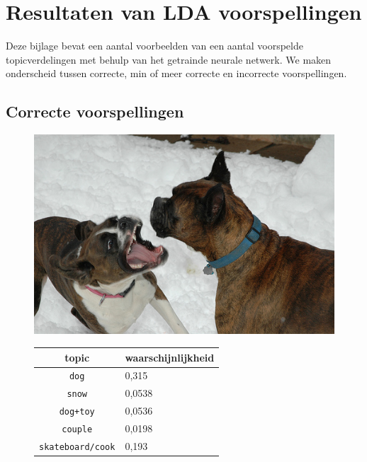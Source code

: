 \chapter{Resultaten van LDA voorspellingen}
\label{app:LDApredictions}
Deze bijlage bevat een aantal voorbeelden van een aantal voorspelde topicverdelingen met behulp van het getrainde neurale netwerk. We maken onderscheid tussen correcte, min of meer correcte en incorrecte voorspellingen.
\section{Correcte voorspellingen}
\begin{figure}[!htb]
    \centering
    \begin{minipage}[t]{.5\linewidth}
    \centering
    \vspace{0pt}
    \includegraphics[width=\textwidth]{Images/LDA/3348384389.jpg}
    \end{minipage}\hfill
    \begin{minipage}[t]{.5\textwidth}
    \centering
    \vspace{0pt}
    \begin{tabular}{cl}
            topic                           & waarschijnlijkheid\\
            \hline
            \texttt{dog}             & 0,315 \\
            \texttt{snow}                   & 0,0538 \\
            \texttt{dog+toy} & 0,0536\\
            \texttt{couple}                  & 0,0198 \\
            \texttt{skateboard/cook}           & 0,193 \\
            \hline
        \end{tabular}
    \end{minipage}
\end{figure}

